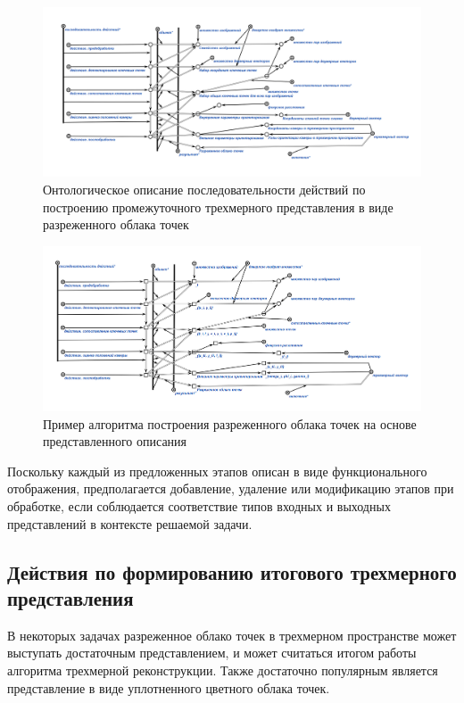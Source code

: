 \begin{figure}[H]
    \includegraphics[scale=0.8, width=1.0\textwidth]{author/part4/figures/reconstruction.png}
    \caption{Онтологическое описание последовательности действий по построению промежуточного трехмерного представления в виде разреженного облака точек}
    \label{fig:reconstruction}
\end{figure}

\begin{figure}[H]
    \includegraphics[scale=0.8, width=1.0\textwidth]{author/part4/figures/reconstruction-example.png}
    \caption{Пример алгоритма построения разреженного облака точек на основе представленного описания}
    \label{fig:reconstruction-example}
\end{figure}

Поскольку каждый из предложенных этапов описан в виде функционального отображения, предполагается добавление, удаление или модификацию этапов при обработке, если соблюдается соответствие типов входных и выходных представлений в контексте решаемой задачи.

\subsection{Действия по формированию итогового трехмерного представления}

В некоторых задачах разреженное облако точек в трехмерном пространстве может выступать достаточным представлением, и может считаться итогом работы алгоритма трехмерной реконструкции. Также достаточно популярным является представление в виде уплотненного цветного облака точек.

